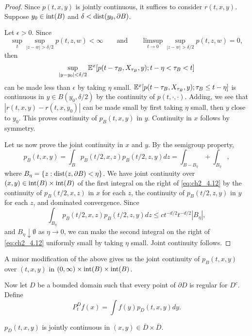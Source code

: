 \begin{proof}
Since $p(t,x,y)$ is jointly continuous, it suffices to consider $r(t,x,y)$.
Suppose $y_0 \in \operatorname{int}(B)$ and $\delta < \operatorname{dist}(y_0,\partial B)$.

Let $\epsilon > 0$. Since
\[
    \sup_t \sup_{|z-w|>\delta/2} p(t,z,w) < \infty \qquad\text{and}\qquad \limsup_{t\to0} \sup_{|z-w|>\delta/2} p(t,z,w) = 0,
\]
then
\[
    \sup_{|y-y_0|<\delta/2} \mathbb{E}^x[p(t-\tau_B,X_{\tau_B},y);t-\eta < \tau_B < t]
\]
can be made less than $\epsilon$ by taking $\eta$ small. $\mathbb{E}^x[p(t-\tau_B,X_{\tau_B},y);\tau_B \leq t-\eta]$ is continuous in $y \in B(y_0,\delta/2)$ by the continuity of $p(t,\cdot,\cdot)$. Adding, we see that $|r(t,x,y) - r(t,x,y_0)|$ can be made small by first taking $\eta$ small, then $y$ close to $y_0$. This proves continuity of $p_B(t,x,y)$ in $y$. Continuity in $x$ follows by symmetry.

Let us now prove the joint continuity in $x$ and $y$. By the semigroup
property,
\begin{equation}\label{eq:ch2_4.12}
    p_B(t,x,y) = \int_B p_B(t/2,x,z)p_B(t/2,z,y)dz = \int_{B-B_\eta} + \int_{B_\eta},
\end{equation}
where $B_\eta = \{z : \operatorname{dist}(z,\partial B) < \eta\}$. We have joint continuity over $(x,y) \in \operatorname{int}(B) \times \operatorname{int}(B)$ of the first integral on the right of \eqref{eq:ch2_4.12} by the continuity of $p_B(t/2,x,z)$ in $x$ for each $z$, the continuity of $p_B(t/2,z,y)$ in $y$ for each $z$, and dominated convergence. Since
\[
    \int_{B_\eta} p_B(t/2,x,z)p_B(t/2,z,y)dz \leq ct^{-d/2}t^{-d/2}|B_\eta|,
\]
and $B_\eta \downarrow \emptyset$ as $\eta \to 0$, we can make the second integral on the right of \eqref{eq:ch2_4.12}
uniformly small by taking $\eta$ small. Joint continuity follows.
\end{proof}

A minor modification of the above gives us the joint continuity of
$p_B(t,x,y)$ over $(t,x,y)$ in $(0,\infty) \times \operatorname{int}(B) \times \operatorname{int}(B)$.

Now let $D$ be a bounded domain such that every point of $\partial D$ is regular for $D^c$. Define
\begin{equation}\label{eq:ch2_4.13}
    P_t^Df(x) = \int f(y)p_D(t,x,y) dy.
\end{equation}

\begin{proposition}\label{prop:ch2_4.7}
$p_D(t,x,y)$ is jointly continuous in $(x,y) \in \overline{D} \times \overline{D}$.
\end{proposition}

